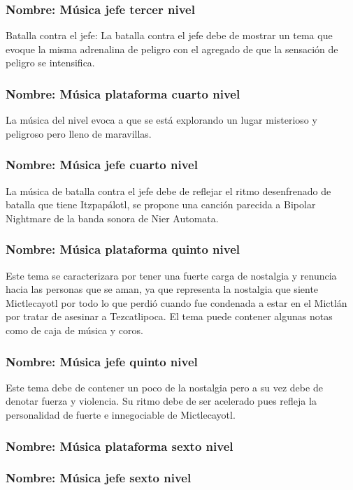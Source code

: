 \documentclass[11pt,letterpaper]{article}
\begin{document}
\subsubsection{Nombre: Música jefe tercer nivel} 
Batalla contra el jefe: La batalla contra el jefe debe de mostrar un tema que evoque la misma adrenalina de peligro con el agregado de que la sensación de peligro se intensifica.

\subsubsection{Nombre: Música plataforma cuarto nivel}
La música del nivel evoca a que se está explorando un lugar misterioso y peligroso pero lleno de maravillas.
\subsubsection{Nombre: Música jefe cuarto nivel} 
La música de batalla contra el jefe debe de reflejar el ritmo desenfrenado de batalla que tiene Itzpapálotl, se propone una canción parecida a Bipolar Nightmare de la banda sonora de Nier Automata.

\subsubsection{Nombre: Música plataforma quinto nivel}
Este tema se caracterizara por tener una fuerte carga de nostalgia y renuncia hacia las personas que se aman, ya que representa la nostalgia que siente Mictlecayotl por todo lo que perdió cuando fue condenada a estar en el Mictlán por tratar de asesinar a Tezcatlipoca. El tema puede contener algunas notas como de caja de música y coros.
\subsubsection{Nombre: Música jefe quinto nivel} 
Este tema debe de contener un poco de la nostalgia pero a su vez debe de denotar fuerza y violencia. Su ritmo debe de ser acelerado pues refleja la personalidad de fuerte e innegociable de Mictlecayotl.


\subsubsection{Nombre: Música plataforma sexto nivel}
\subsubsection{Nombre: Música jefe sexto nivel} 
\end{document}
